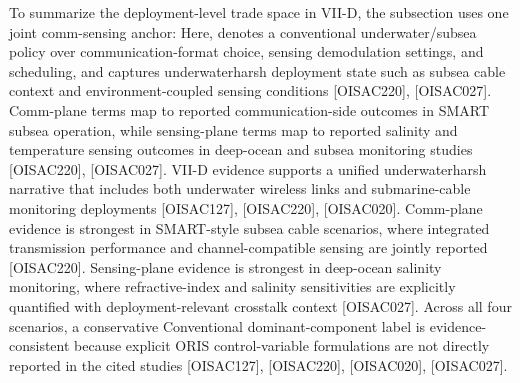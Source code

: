 {}To summarize the deployment-level trade space in VII-D, the subsection uses one joint comm-sensing anchor:\markdownRendererParagraphSeparator
{}\markdownRendererSoftLineBreak
{}\markdownRendererParagraphSeparator
{}Here,  denotes a conventional underwater/subsea policy over communication-format choice, sensing demodulation settings, and scheduling, and  captures underwater\markdownRendererUnderscore{}harsh deployment state such as subsea cable context and environment-coupled sensing conditions [O\markdownRendererUnderscore{}ISAC\markdownRendererUnderscore{}220], [O\markdownRendererUnderscore{}ISAC\markdownRendererUnderscore{}027]. Comm-plane terms map to reported communication-side outcomes in SMART subsea operation, while sensing-plane terms map to reported salinity and temperature sensing outcomes in deep-ocean and subsea monitoring studies [O\markdownRendererUnderscore{}ISAC\markdownRendererUnderscore{}220], [O\markdownRendererUnderscore{}ISAC\markdownRendererUnderscore{}027].\markdownRendererParagraphSeparator
{}\markdownRendererInterblockSeparator
{}\markdownRendererUlBeginTight
\markdownRendererUlItem VII-D evidence supports a unified underwater\markdownRendererUnderscore{}harsh narrative that includes both underwater wireless links and submarine-cable monitoring deployments [O\markdownRendererUnderscore{}ISAC\markdownRendererUnderscore{}127], [O\markdownRendererUnderscore{}ISAC\markdownRendererUnderscore{}220], [O\markdownRendererUnderscore{}ISAC\markdownRendererUnderscore{}020].\markdownRendererUlItemEnd 
\markdownRendererUlItem Comm-plane evidence is strongest in SMART-style subsea cable scenarios, where integrated transmission performance and channel-compatible sensing are jointly reported [O\markdownRendererUnderscore{}ISAC\markdownRendererUnderscore{}220].\markdownRendererUlItemEnd 
\markdownRendererUlItem Sensing-plane evidence is strongest in deep-ocean salinity monitoring, where refractive-index and salinity sensitivities are explicitly quantified with deployment-relevant crosstalk context [O\markdownRendererUnderscore{}ISAC\markdownRendererUnderscore{}027].\markdownRendererUlItemEnd 
\markdownRendererUlItem Across all four scenarios, a conservative Conventional dominant-component label is evidence-consistent because explicit ORIS control-variable formulations are not directly reported in the cited studies [O\markdownRendererUnderscore{}ISAC\markdownRendererUnderscore{}127], [O\markdownRendererUnderscore{}ISAC\markdownRendererUnderscore{}220], [O\markdownRendererUnderscore{}ISAC\markdownRendererUnderscore{}020], [O\markdownRendererUnderscore{}ISAC\markdownRendererUnderscore{}027].\markdownRendererUlItemEnd 
